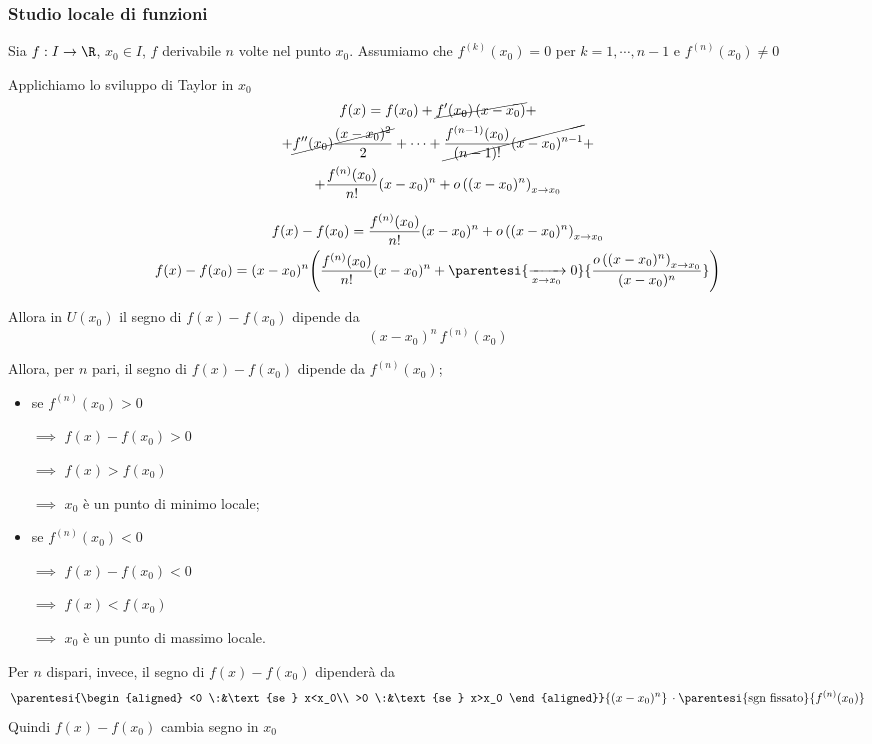 \subsubsection{Studio locale di funzioni}
Sia $ f:I\to \R $, $ x_0 \in I $, $ f $ derivabile $ n $ volte nel punto $ x_0 $. Assumiamo che $ f^{(k)}(x_0)=0 $ per $ k=1,\cdots, n-1 $ e $ f^{(n)}(x_0)\neq 0$

Applichiamo lo sviluppo di Taylor in $ x_0 $ 
    \begin{multline*}
        f(x)=f(x_0)+ \cancel{f'(x_0)\,(x-x_0)}+\\+\cancel{f''(x_0)\frac{(x-x_0)^{2}}{2}}+\cdots+\cancel{\frac{f^{(n-1)}(x_0)}{(n-1)!}(x-x_0)^{n-1}}+\\+\frac{f^{(n)}(x_0)}{n!}(x-x_0)^{n}+ o\left((x-x_0)^{n}\right)_{x\to x_0}
    \end{multline*}
    
\begin{gather*}
    f(x)-f(x_0)=\frac{f^{(n)}(x_0)}{n!}(x-x_0)^{n}+ o\left((x-x_0)^{n}\right)_{x\to x_0}\\
    f(x)-f(x_0)=(x-x_0)^{n}\Biggl(\frac{f^{(n)}(x_0)}{n!}(x-x_0)^{n}+ \parentesi{ \xrightarrow[x\to x_0]{} 0 \displaystyle}{\frac{o\left((x-x_0)^{n}\right)_{x\to x_0}}{(x-x_0)^{n}}}\Biggr)
\end{gather*}

Allora in $ U(x_0) $ il segno di $ f(x)-f(x_0) $ dipende da \[
    (x-x_0)^{n}\,f^{(n)}(x_0)
\]

Allora, per $ n $ pari, il segno di $ f(x)-f(x_0) $ dipende da $ f^{(n)}(x_0) $; 
\begin{itemize}
    \item se $ f^{(n)}(x_0)>0 $ 

    $\implies$ $ f(x)-f(x_0)>0 $ 
    
    $\implies$ $ f(x)>f(x_0) $ 
    
    $\implies$ $ x_0 $ è un punto di minimo locale;
    \item se $ f^{(n)}(x_0)<0 $ 

    $\implies$ $ f(x)-f(x_0)<0 $ 
    
    $\implies$ $ f(x)<f(x_0) $ 
    
    $\implies$ $ x_0 $ è un punto di massimo locale.
\end{itemize}

Per $ n $ dispari, invece, il segno di $ f(x)-f(x_0) $ dipenderà da 
\[
    \parentesi{\begin{aligned}
        <0 \:&\text{se } x<x_0\\
        >0 \:&\text{se } x>x_0
    \end{aligned}}{(x-x_0)^{n}}\, \cdot \parentesi{\text{sgn fissato}}{f^{(n)}(x_0)}
\]
Quindi $ f(x)-f(x_0) $ cambia segno in $ x_0 $ 


